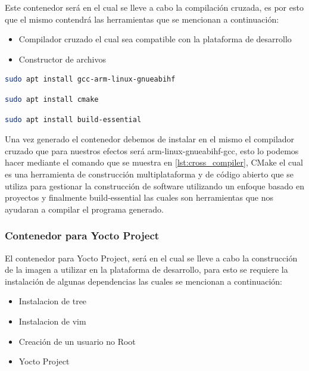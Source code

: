 Este contenedor será en el cual se lleve a cabo la compilación cruzada, es por esto que el mismo contendrá las herramientas que se mencionan a continuación:

\begin{itemize}
    \item Compilador cruzado el cual sea compatible con la plataforma de desarrollo
    \item Constructor de archivos
\end{itemize}

\begin{lstlisting}[language=bash, caption={Instalacion del compilador cruzado, Contenedor}, label=lst:cross_compiler]
    sudo apt install gcc-arm-linux-gnueabihf
\end{lstlisting}

\begin{lstlisting}[language=bash, caption={Instalacion de CMake, Contenedor}, label=lst:cmake]
    sudo apt install cmake
\end{lstlisting}

\begin{lstlisting}[language=bash, caption={Instalacion de build essential, Contenedor }, label=lst:build_essential]
    sudo apt install build-essential
\end{lstlisting}

Una vez generado el contenedor debemos de instalar en el mismo el compilador cruzado que para nuestros efectos será arm-linux-gnueabihf-gcc, esto lo podemos hacer mediante el comando que se muestra en \ref{lst:cross_compiler},  CMake el cual es una herramienta de construcción multiplataforma y de código abierto que se utiliza para gestionar la construcción de software utilizando un enfoque basado en proyectos y finalmente build-essential las cuales son herramientas que nos ayudaran a compilar el programa generado.


\subsubsection{Contenedor para Yocto Project}\label{subsec:generacion_entorno_yocto}

El contenedor para Yocto Project, será en el cual se lleve a cabo la construcción de la imagen a utilizar en la plataforma de desarrollo, para esto se requiere la instalación de algunas dependencias las cuales se mencionan a continuación:

\begin{itemize}
    \item Instalacion de tree 
    \item Instalacion de vim
    \item Creación de un usuario no Root
    \item Yocto Project
\end{itemize}

